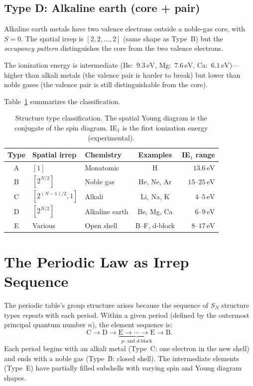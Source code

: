 \documentclass[aps,prl,twocolumn,superscriptaddress,longbibliography]{revtex4-2}
\newcommand{\eV}{\,\mathrm{eV}}
\begin{document}
\subsection{Type D: Alkaline earth (core + pair)}

Alkaline earth metals have two valence electrons outside a noble-gas
core, with $S = 0$.  The spatial irrep is $[2, 2, \ldots, 2]$ (same
shape as Type~B) but the \emph{occupancy pattern} distinguishes the
core from the two valence electrons.

The ionization energy is intermediate (Be:~$9.3\eV$, Mg:~$7.6\eV$,
Ca:~$6.1\eV$)---higher than alkali metals (the valence pair is harder
to break) but lower than noble gases (the valence pair is still
distinguishable from the core).

Table~\ref{tab:types} summarizes the classification.

\begin{table}[h]
\centering
\caption{Structure type classification.  The spatial Young diagram is
the conjugate of the spin diagram.  IE$_1$ is the first ionization
energy (experimental).}
\label{tab:types}
\begin{tabular}{cllcr}
\toprule
Type & Spatial irrep & Chemistry & Examples & IE$_1$ range \\
\midrule
A & $[1]$       & Monatomic       & H            & $13.6\eV$ \\
B & $[2^{N/2}]$ & Noble gas       & He, Ne, Ar   & $15$--$25\eV$ \\
C & $[2^{(N-1)/2}, 1]$ & Alkali  & Li, Na, K    & $4$--$5\eV$ \\
D & $[2^{N/2}]$ & Alkaline earth  & Be, Mg, Ca   & $6$--$9\eV$ \\
E & Various     & Open shell      & B--F, d-block& $8$--$17\eV$ \\
\bottomrule
\end{tabular}
\end{table}


\section{The Periodic Law as Irrep Sequence}
\label{sec:periodic_law}

The periodic table's group structure arises because the sequence of
$S_N$ structure types \emph{repeats} with each period.  Within a given
period (defined by the outermost principal quantum number $n$), the
element sequence is:
\begin{equation}
  \mathrm{C} \to \mathrm{D} \to \underbrace{\mathrm{E} \to \cdots \to
  \mathrm{E}}_{p\text{- and }d\text{-block}} \to \mathrm{B}.
  \label{eq:period_sequence}
\end{equation}
Each period begins with an alkali metal (Type~C: one electron in the
new shell) and ends with a noble gas (Type~B: closed shell).  The
intermediate elements (Type~E) have partially filled subshells with
varying spin and Young diagram shapes.
\end{document}
